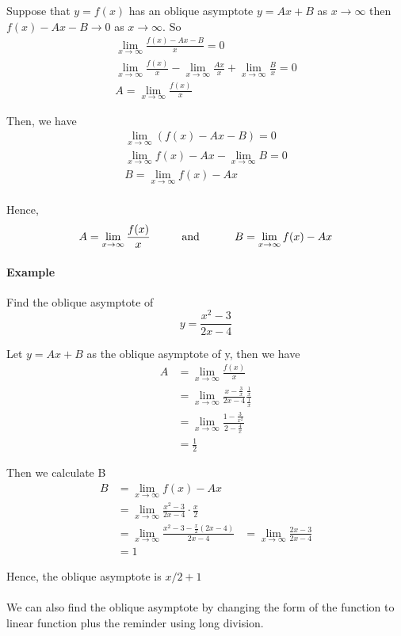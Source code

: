 \documentclass[12pt]{article}
\newcommand\tab[1][1cm]{\hspace*{#1}}
\begin{document}
Suppose that $y = f(x)$ has an oblique asymptote $y = Ax + B$ as $x \to \infty$ then $f(x) - Ax - B \to 0$ as
$x \to \infty$. So 
\begin{align*} 
    \lim_{x \to \infty} \frac{f(x) - Ax - B}{x} = 0 \\
    \lim_{x \to \infty} \frac{f(x)}{x} - \lim_{x \to \infty} \frac{Ax}{x} +\lim_{x \to \infty} \frac{B}{x} = 0 \\
    A = \lim_{x \to \infty} \frac{f(x)}{x}
\end{align*}

Then, we have
\begin{align*} 
    \lim_{x \to \infty} (f(x) - Ax - B) = 0 \\
    \lim_{x \to \infty} f(x) - Ax - \lim_{x \to \infty} B = 0 \\
    B = \lim_{x \to \infty} f(x) - Ax \\
\end{align*}

Hence,
\[
    A = \lim_{x \to \infty} \frac{f(x)}{x} \textrm{\tab and \tab} B = \lim_{x \to \infty} f(x) - Ax
\]

\paragraph{Example} Find the oblique asymptote of
\[
    y = \frac{x^2 - 3}{2x - 4} 
\]

Let $y = Ax + B$ as the oblique asymptote of y, then we have
\begin{align*} 
    A &= \lim_{x \to \infty} \frac{f(x)}{x}\\
    &= \lim_{x \to \infty} \frac{x - \frac{3}{x}}{2x - 4} \frac{\frac{1}{x}}{\frac{1}{x}} \\
    &= \lim_{x \to \infty} \frac{1 - \frac{3}{x^2}}{2 - \frac{4}{x}} \\
    &= \frac{1}{2}
\end{align*}

Then we calculate B
\begin{align*} 
    B &= \lim_{x \to \infty} f(x) - Ax \\
    &= \lim_{x \to \infty} \frac{x^2 - 3}{2x - 4} \cdot \frac{x}{2} \\
    &= \lim_{x \to \infty} \frac{x^2 - 3 -\frac{x}{2}(2x - 4)}{2x - 4} 
    &= \lim_{x \to \infty} \frac{2x - 3}{2x - 4} \\
    &= 1 
\end{align*}

Hence, the oblique asymptote is $x/2 + 1$ \\ \\
We can also find the oblique asymptote by changing the form of the function to linear function plus the reminder using long division.
\end{document}

